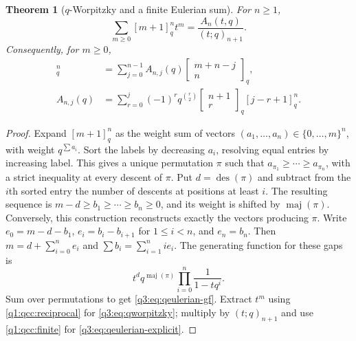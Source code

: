 \documentclass[11pt,a4paper,oneside,openany]{book}
\newtheorem{theorem}{Theorem}[chapter]
\theoremstyle{definition}
\theoremstyle{remark}
\newcommand{\GB}[3][q]{\begin{bmatrix}#2\\#3\end{bmatrix}_{#1}}
\newcommand{\G}[2]{\GB{#1}{#2}}
\newcommand{\des}{\operatorname{des}}
\newcommand{\maj}{\operatorname{maj}}
\begin{document}
\begin{theorem}[$q$-Worpitzky and a finite Eulerian sum]
\label{q3:thm:worpitzky}
For $n\ge1$,
\begin{equation}
 \sum_{m\ge0}[m+1]_q^n t^m=\frac{A_n(t,q)}{(t;q)_{n+1}}.
 \label{q3:eq:qeulerian-gf}
\end{equation}
Consequently, for $m\ge0$,
\begin{align}
 [m+1]_q^n&=\sum_{j=0}^{n-1}A_{n,j}(q)\G{m+n-j}n,
 \label{q3:eq:qworpitzky}\\
 A_{n,j}(q)&=\sum_{r=0}^j(-1)^rq^{\binom r2}\G{n+1}r[j-r+1]_q^n.
 \label{q3:eq:qeulerian-explicit}
\end{align}
\end{theorem}
\begin{proof}
Expand $[m+1]_q^n$ as the weight sum of vectors
$(a_1,\ldots,a_n)\in\{0,\ldots,m\}^n$, with weight $q^{\sum a_i}$.
Sort the labels by decreasing $a_i$, resolving equal entries by
increasing label. This gives a unique permutation $\pi$ such that
$a_{\pi_1}\ge\cdots\ge a_{\pi_n}$, with a strict inequality at every
descent of $\pi$. Put $d=\des(\pi)$ and subtract from the $i$th sorted
entry the number of descents at positions at least $i$. The resulting
sequence is
$ m-d\ge b_1\ge\cdots\ge b_n\ge0$, and its weight is shifted by
$\maj(\pi)$. Conversely, this construction reconstructs exactly the
vectors producing $\pi$.
Write $e_0=m-d-b_1$, $e_i=b_i-b_{i+1}$ for $1\le i<n$, and $e_n=b_n$.
Then $m=d+\sum_{i=0}^ne_i$ and $\sum b_i=\sum_{i=1}^ni e_i$.
The generating function for these gaps is
\[
 t^dq^{\maj(\pi)}\prod_{i=0}^n\frac1{1-tq^i}.
\]
Sum over permutations to get \cref{q3:eq:qeulerian-gf}. Extract $t^m$
using \cref{q1:qcc:reciprocal} for \cref{q3:eq:qworpitzky}; multiply by
$(t;q)_{n+1}$ and use \cref{q1:qcc:finite} for
\cref{q3:eq:qeulerian-explicit}.
\end{proof}
\end{document}
